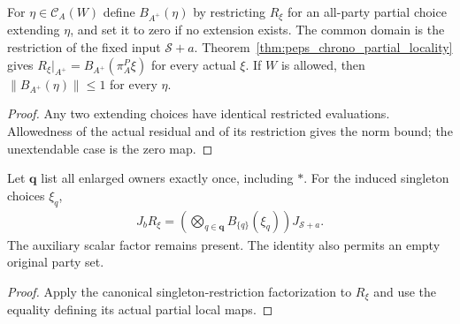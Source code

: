 \begin{definition}
    \label{def:peps_chrono_partial_local_maps}
    \leanok
    For $\eta\in\mathcal C_A(W)$ define $B_{A^+}(\eta)$ by restricting
    $R_\xi$ for an all-party partial choice extending $\eta$, and set it to zero
    if no extension exists. The common domain is the restriction of the fixed
    input $\mathcal S\mathbin{+}a$. Theorem~\ref{thm:peps_chrono_partial_locality}
    gives
    $R_\xi|_{A^+}=B_{A^+}(\pi_A^P\xi)$ for every actual $\xi$.
    If $W$ is allowed, then $\|B_{A^+}(\eta)\|\le1$ for every $\eta$.
\end{definition}

\begin{proof}
    \leanok
    Any two extending choices have identical restricted evaluations. Allowedness
    of the actual residual and of its restriction gives the norm bound; the
    unextendable case is the zero map.
\end{proof}

\begin{theorem}
    \label{thm:peps_chrono_partial_factors}
    \leanok
    Let $\mathbf q$ list all enlarged owners exactly once, including $\ast$.
    For the induced singleton choices $\xi_q$,
    \begin{align}
        J_b R_\xi=\left(\bigotimes_{q\in\mathbf q}B_{\{q\}}(\xi_q)\right)
        J_{\mathcal S\mathbin{+}a}.
        \label{eq:peps_chrono_partial_factors}
    \end{align}
    The auxiliary scalar factor remains present. The identity also permits an
    empty original party set.
\end{theorem}

\begin{proof}
    \leanok
    Apply the canonical singleton-restriction factorization to $R_\xi$ and use
    the equality defining its actual partial local maps.
\end{proof}

